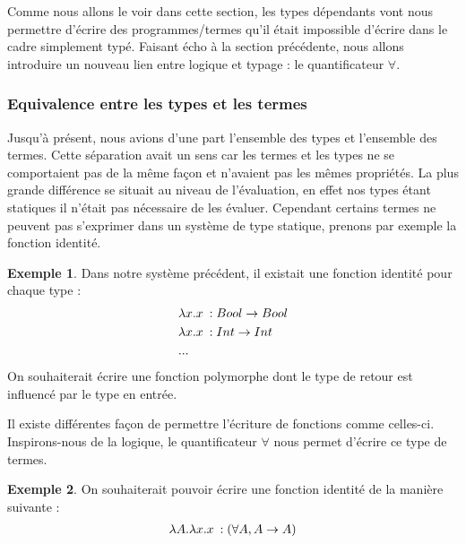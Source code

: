 \documentclass {article}
\theoremstyle{definition}
\newtheorem{example}{Exemple}
\theoremstyle{remark}
\begin{document}
Comme nous allons le voir dans cette section, les types dépendants vont nous permettre d'écrire des programmes/termes qu'il était impossible d'écrire dans le cadre simplement typé. Faisant écho à la section précédente,
nous allons introduire un nouveau lien entre logique et typage : le quantificateur $\forall$.

\subsubsection{Equivalence entre les types et les termes}
\label{presentation_type_dependants}

Jusqu'à présent, nous avions d'une part l'ensemble des types et l'ensemble des termes. Cette séparation 
avait un sens car les termes et les types ne se comportaient pas de la même façon et n'avaient pas les mêmes propriétés. 
La plus grande différence se situait au niveau de l'évaluation, en effet nos types étant statiques il n'était pas nécessaire de les évaluer.
Cependant certains termes ne peuvent pas s'exprimer dans un système de type statique, prenons par exemple
la fonction identité. 
\begin{example}
  Dans notre système précédent, il existait une fonction identité pour chaque type :
  \begin{align*}
    &\lambda x. x\: :Bool\rightarrow Bool \\
    &\lambda x. x\: :Int\rightarrow Int \\
    & ... \\
  \end{align*}
On souhaiterait écrire une fonction polymorphe dont le type de retour est influencé par le type en entrée.
\end{example}

Il existe différentes façon de permettre l'écriture de fonctions comme celles-ci. Inspirons-nous de la
logique, le quantificateur $\forall$ nous permet d'écrire ce type de termes.
\begin{example}
  On souhaiterait pouvoir écrire une fonction identité de la manière suivante :
  \begin{align*}
    \lambda A. \lambda x. x\::(\forall A, A \rightarrow A)
  \end{align*}
\end{example}

\newcommand{\nil}{\ensuremath{\mathsf{nil}}}
\newcommand{\cons}{\ensuremath{\mathsf{cons}}}
\newcommand{\Vect}{\ensuremath{\mathsf{vec}}}
\end{document}
